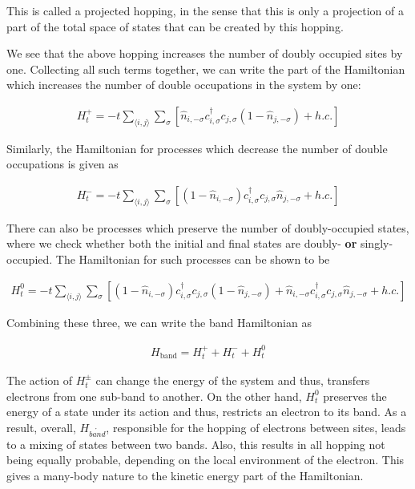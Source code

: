\documentclass[]{report}
\begin{document}
This is called a projected hopping, in the sense that this is only a projection of a part of the total space of states that can be created by this hopping.

We see that the above hopping increases the number of doubly occupied sites by one. Collecting all such terms together, we can write the part of the Hamiltonian which increases the number of double occupations in the system by one:

\begin{align}
H^{+}_{t} = -t \sum_{\langle i, j \rangle} \sum_{\sigma} \left[ \hat{n}_{i, -\sigma} c^{\dagger}_{i, \sigma} c_{j, \sigma} (1 - \hat{n}_{j, -\sigma}) + h.c.\right]
\end{align}

\newpage
Similarly, the Hamiltonian for processes which decrease the number of double occupations is given as

\begin{align}
	H^{-}_{t} = -t \sum_{\langle i, j \rangle} \sum_{\sigma} \left[ (1 - \hat{n}_{i, -\sigma}) c^{\dagger}_{i, \sigma} c_{j, \sigma} \hat{n}_{j, -\sigma} + h.c.\right]
\end{align}

There can also be processes which preserve the number of doubly-occupied states, where we check whether both the initial and final states are doubly- \textbf{or} singly-occupied. The Hamiltonian for such processes can be shown to be

\begin{align}
	H^{0}_{t} = -t \sum_{\langle i, j \rangle} \sum_{\sigma} \left[ (1 - \hat{n}_{i, -\sigma}) c^{\dagger}_{i, \sigma} c_{j, \sigma} (1 - \hat{n}_{j, -\sigma}) + \hat{n}_{i, -\sigma} c^{\dagger}_{i, \sigma} c_{j, \sigma} \hat{n}_{j, -\sigma} + h.c.\right]
\end{align}

Combining these three, we can write the band Hamiltonian as

\begin{align}
	H_{\mathrm{band}} = H^{+}_{t} + H^{-}_{t} + H^{0}_{t}
\end{align}

The action of $ H^{\pm}_{t} $ can change the energy of the system and thus, transfers electrons from one sub-band to another. On the other hand, $ H^{0}_{t} $ preserves the energy of a state under its action and thus, restricts an electron to its band. As a result, overall, $ H_{\mathring{band}} $, responsible for the hopping of electrons between sites, leads to a mixing of states between two bands. Also, this results in all hopping not being equally probable, depending on the local environment of the electron. This gives a many-body nature to the kinetic energy part of the Hamiltonian.
\end{document}
